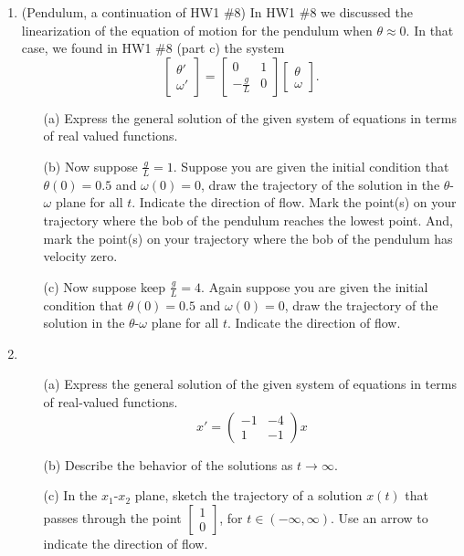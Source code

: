 \documentclass[11pt]{article}
\theoremstyle{definition}
\begin{document}
\begin{enumerate}[leftmargin=*]
\item (Pendulum, a continuation of HW1 \#8) In HW1 \#8 we discussed the linearization of the equation of motion for the pendulum when $\theta\approx 0$.  In that case, we found in HW1 \#8 (part c)  the system 
\[
\left[
\begin{array}{c}
\theta' \\
\omega'
\end{array}\right]= \left[
\begin{array}{cc}
0 &1 \\
-\frac{g}{L}& 0
\end{array}\right]\left[
\begin{array}{c}
\theta \\
\omega
\end{array}\right].
\]

\begin{itemize}

\item[(a)] Express the general solution of the given system of equations in terms of real valued functions.

\item[(b)] Now suppose $\frac{g}{L}=1$.    Suppose you are given the initial condition that $\theta(0)= 0.5$ and $\omega(0)=0$, draw the trajectory of the solution in the $\theta$-$\omega$ plane for all $t$.  Indicate the direction of flow.  Mark the point(s) on your trajectory where the bob of the pendulum reaches the lowest point.  And, mark the point(s) on your trajectory where the bob of the pendulum has velocity zero.

\item[(c)] Now suppose keep $\frac{g}{L}=4$.  Again suppose you are given the initial condition that $\theta(0)= 0.5$ and $\omega(0)=0$, draw the trajectory of the solution in the $\theta$-$\omega$ plane for all $t$.  Indicate the direction of flow.  
  
\end{itemize}



\item 
\begin{itemize}
\item[(a)] Express the general solution of the given system of equations in terms of real-valued functions.
\[
x'=\left(
\begin{array}{cc}
-1 & -4\\
1 & -1
\end{array}\right)x
\]
\item[(b)] Describe the behavior of the solutions as $t\to \infty$.
\item[(c)] In the $x_1$-$x_2$ plane, sketch the trajectory of a solution $x(t)$ that passes through the point $\left[\begin{array}{c} 1\\ 0 \end{array}\right]$, for $t\in (-\infty, \infty)$.   Use an arrow to indicate the direction of flow.\\
\end{itemize}





\end{enumerate}
\end{document}
